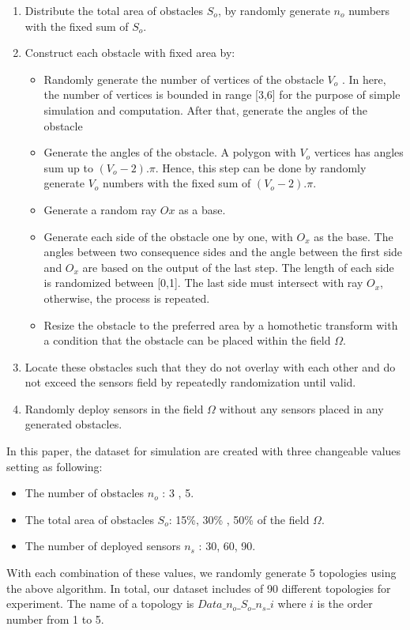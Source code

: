 \documentclass[final]{elsarticle}
\begin{document}
\begin{enumerate}
	\item Distribute the total area of obstacles $S_o$, by randomly generate $n_o$ numbers with the fixed sum of $S_o$.
	\item Construct each obstacle with fixed area by:
	\begin{itemize}
		\item Randomly generate the number of vertices of the obstacle $V_o$ . In here, the number of vertices is bounded in range [3,6] for the purpose of simple simulation and computation. After that, generate the angles of the obstacle 
		\item Generate the angles of the obstacle. A polygon with $V_o$ vertices has angles sum up to $(V_o - 2).\pi$. Hence, this step can be done by randomly generate $V_o$ numbers with the fixed sum of $(V_o - 2).\pi$.
		\item Generate a random ray $Ox$ as a base.
		\item Generate each side of the obstacle one by one, with $O_x$ as the base. The angles between two consequence sides and the angle between the first side and $O_x$ are based on the output of the last step. The length of each side is randomized between [0,1]. The last side must intersect with ray $O_x$, otherwise, the process is repeated.
		\item Resize the obstacle to the preferred area by a homothetic transform with a condition that the obstacle can be placed within the field $\Omega$.
	\end{itemize}
	\item Locate these obstacles such that they do not overlay with each other and do not exceed the sensors field by repeatedly randomization until valid.
	\item Randomly deploy sensors in the field $\Omega$ without any sensors placed in any generated obstacles.
\end{enumerate}

In this paper, the dataset for simulation are created with three changeable values setting as following:
\begin{itemize}
	\item The number of obstacles $n_o$ : 3 , 5.
	\item The total area of obstacles $S_o$: 15\%, 30\% , 50\% of the field $\Omega$.
	\item The number of deployed sensors $n_s$ : 30, 60, 90.
\end{itemize}
With each combination of these values, we randomly generate 5 topologies using the above algorithm. In total, our dataset includes of 90 different topologies for experiment. The name of a topology is $Data\_n_o\_S_o\_n_s\_i$ where $ i $ is the order number from 1 to 5.
\end{document}
